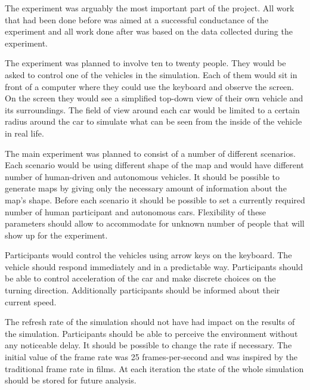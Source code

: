 \documentclass[11pt,english,twoside]{article}
\begin{document}
The experiment was arguably the most important part of the project. All work that had been done before was aimed at a successful conductance of the experiment and all work done after was based on the data collected during the experiment. 



\par

The experiment was planned to involve ten to twenty people. They would be asked to control one of the vehicles in the simulation. Each of them would sit in front of a computer where they could use the keyboard and observe the screen. On the screen they would see a simplified top-down view of their own vehicle and its surroundings. The field of view around each car would be limited to a certain radius around the car to simulate what can be seen from the inside of the vehicle in real life. %

\par

The main experiment was planned to consist of a number of different scenarios. Each scenario would be using different shape of the map and would have different number of human-driven and autonomous vehicles. It should be possible to generate maps by giving only the necessary amount of information about the map's shape. Before each scenario it should be possible to set a currently required number of human participant and autonomous cars. Flexibility of these parameters should allow to accommodate for unknown number of people that will show up for the experiment.


\par


Participants would control the vehicles using arrow keys on the keyboard. The vehicle should respond immediately and in a predictable way. Participants should be able to control acceleration of the car and make discrete choices on the turning direction. Additionally participants should be informed about their current speed.  
\par

The refresh rate of the simulation should not have had impact on the results of the simulation. Participants should be able to perceive the environment without any noticeable delay. It should be possible to change the rate if necessary. The initial value of the frame rate was 25 frames-per-second and was inspired by the traditional frame rate in films. 
At each iteration the state of the whole simulation should be stored for future analysis. 
\end{document}
